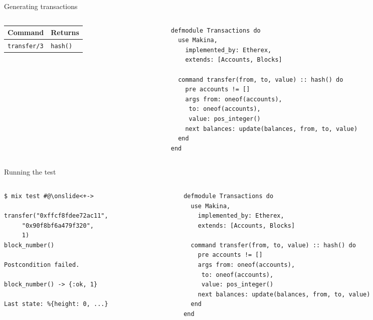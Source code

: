 \documentclass[aspectratio=169, 10pt, handout]{beamer}
\begin{document}
\begin{frame}[label={sec:org0e4a1ad},fragile]{Generating transactions}
 \begin{columns}
\begin{column}{0.44\columnwidth}
\onslide<+->
\begin{center}
\begin{tabular}{ll}
Command & Returns\\
\hline
\texttt{transfer/3} & \texttt{hash()}\\
\end{tabular}
\end{center}
\end{column}
\begin{column}{0.52\columnwidth}
\onslide<+->
\lstset{language=elixir,label= ,caption= ,captionpos=b,numbers=none,style=display}
\begin{lstlisting}
defmodule Transactions do
  use Makina,
    implemented_by: Etherex,
    extends: [Accounts, Blocks]

  command transfer(from, to, value) :: hash() do
    pre accounts != []
    args from: oneof(accounts),
	 to: oneof(accounts),
	 value: pos_integer()
    next balances: update(balances, from, to, value)
  end
end
\end{lstlisting}
\end{column}
\end{columns}
\end{frame}

\begin{frame}[label={sec:org8f36582},fragile]{Running the test}
 \begin{columns}
\begin{column}{0.44\columnwidth}
\lstset{language=bash,label= ,caption= ,captionpos=b,numbers=none,style=shell}
\begin{lstlisting}
$ mix test #@\onslide<+->

transfer("0xffcf8fdee72ac11",
	 "0x90f8bf6a479f320",
	 1)
block_number()

Postcondition failed.

block_number() -> {:ok, 1}

Last state: %{height: 0, ...}
\end{lstlisting}
\end{column}

\begin{column}{0.52\columnwidth}
\onslide<+->
\lstset{language=elixir,label= ,caption= ,captionpos=b,numbers=none,style=display}
\begin{lstlisting}
defmodule Transactions do
  use Makina,
    implemented_by: Etherex,
    extends: [Accounts, Blocks]

  command transfer(from, to, value) :: hash() do
    pre accounts != []
    args from: oneof(accounts),
	 to: oneof(accounts),
	 value: pos_integer()
    next balances: update(balances, from, to, value)
  end
end
\end{lstlisting}
\end{column}
\end{columns}
\end{frame}
\end{document}
